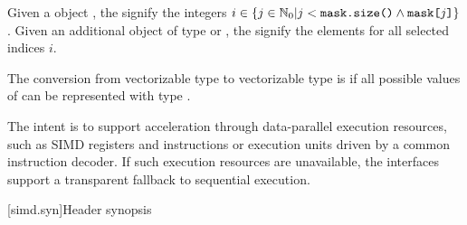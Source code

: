 \pnum
Given a  object ,
the  signify the integers $i \in \{j \in \mathbb{N}_0 | j < \texttt{mask.size()} \wedge \texttt{mask[}j\texttt{]}\}$.
Given an additional object  of type  or ,
the  signify the elements  for all selected indices $i$.

\pnum
The conversion from vectorizable type  to vectorizable type  is  if
all possible values of  can be represented with type .

\pnum
\begin{note}
The intent is to support acceleration through data-parallel execution resources, such as SIMD registers and instructions or execution units driven by a common instruction decoder. If such execution resources are unavailable, the interfaces support a transparent fallback to sequential execution.
\end{note}

[simd.syn]{Header \texorpdfstring{}{<simd>} synopsis}

